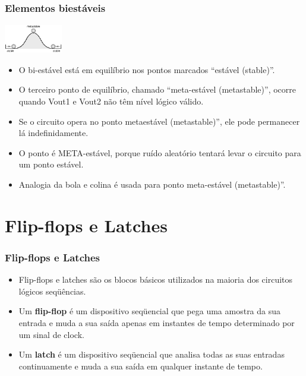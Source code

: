 \documentclass{beamer}
\begin{document}
\begin{frame}
  \frametitle{Elementos biestáveis}
 \begin{center}
  \includegraphics[height = 0.5in, width = 1in]{slide15_filomeno} 
 \end{center}
 \begin{itemize}
  \item O bi-estável está em equilíbrio nos pontos marcados “estável (stable)”.\pause
  \item O terceiro ponto de equilíbrio, chamado “meta-estável (metastable)”, ocorre quando Vout1 e Vout2 não têm nível lógico válido.\pause
  \item Se o circuito opera no ponto metaestável (metastable)”, ele pode permanecer lá  indefinidamente.\pause
  \item O ponto é META-estável, porque ruído aleatório tentará levar o circuito para um ponto estável.\pause
  \item Analogia da bola e colina é usada para ponto meta-estável (metastable)”.
 \end{itemize}
\end{frame}

\section{Flip-flops e Latches}
\begin{frame}
 \frametitle{Flip-flops e Latches}
 \begin{itemize}
  \item Flip-flops e latches  são os blocos básicos utilizados na maioria dos circuitos lógicos seqüências.\pause
  \item Um \textbf{flip-flop} é um dispositivo seqüencial que pega uma amostra da sua entrada e muda a sua saída apenas em instantes de tempo determinado por um 
	sinal de clock.\pause
  \item Um \textbf{latch} é um dispositivo seqüencial que analisa todas as suas entradas continuamente e muda a sua saída em qualquer instante de tempo.
 \end{itemize}
\end{frame}
\end{document}
